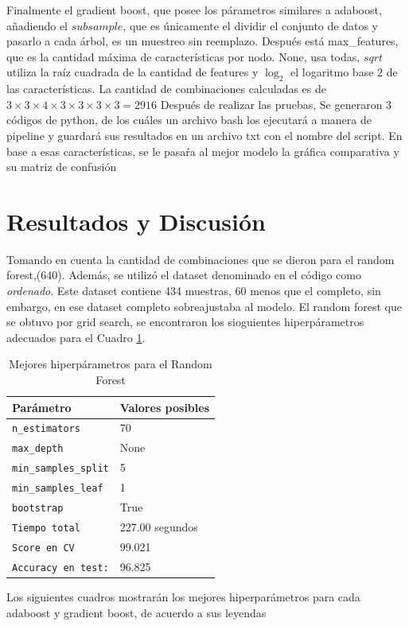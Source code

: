 \documentclass[conference]{IEEEtran}
\begin{document}
Finalmente el gradient boost, que posee los párametros similares a adaboost, añadiendo el $subsample$, que es únicamente el dividir el conjunto de datos y pasarlo a cada árbol, es un muestreo sin reemplazo. Después está max\_features, que es la cantidad máxima de características por nodo. None, usa todas, $sqrt$ utiliza la raíz cuadrada de la cantidad de features y $\log_2$ el logaritmo base 2 de las características. La cantidad de combinaciones calculadas es de $3\times 3 \times 4 \times 3 \times 3 \times 3 \times3=2916$
Después de realizar las pruebas, Se generaron 3 códigos de python, de los cuáles un archivo bash los ejecutará a manera de pipeline y guardará sus resultados en un archivo txt con el nombre del script. En base a esas características, se le pasaŕa al mejor modelo la gráfica comparativa y su matriz de confusión 
\section{Resultados y Discusión}
Tomando en cuenta la cantidad de combinaciones que se dieron para el random forest,(640). Además, se utilizó el dataset denominado en el código como \textit{ordenado}. Este dataset contiene 434 muestras, 60 menos que el completo, sin embargo, en ese dataset completo sobreajustaba al modelo.
El random forest que se obtuvo por grid search, se encontraron los sioguientes hiperpárametros adecuados para el Cuadro \ref{tab:Tabla_4}. 
\begin{table}[ht]
    \centering
    \begin{tabular}{|l|l|}
    \hline
    \textbf{Parámetro} & \textbf{Valores posibles}  \\ \hline
    \texttt{n\_estimators} & 70  \\ \hline
    \texttt{max\_depth} & None  \\ \hline
    \texttt{min\_samples\_split} & 5  \\ \hline
    \texttt{min\_samples\_leaf} & 1 \\ \hline
    \texttt{bootstrap} & True \\ \hline
    \texttt{Tiempo total} & 227.00 segundos \\ \hline
    \texttt{Score en CV} & 99.021 \\ \hline
    \texttt{Accuracy en test:} &96.825 \\ \hline
    \end{tabular}
    \caption{Mejores hiperpárametros para el Random Forest}
    \label{tab:Tabla_4}
\end{table}
Los siguientes cuadros mostrarán los mejores hiperparámetros para cada adaboost y gradient boost, de acuerdo a sus leyendas
\end{document}
